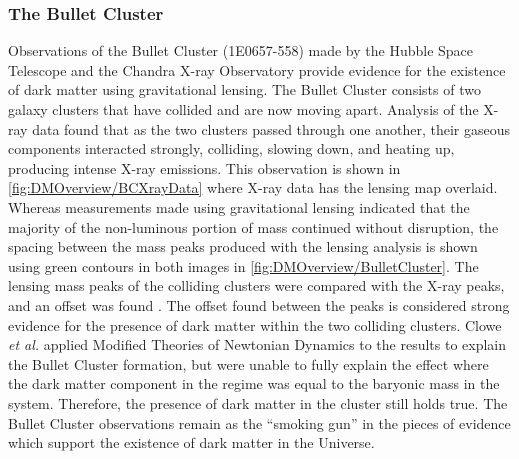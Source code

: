 \subsubsection{The Bullet Cluster}\label{sec:DMOverview/BulletCluster}
Observations of the Bullet Cluster (1E0657-558) made by the Hubble Space Telescope and the Chandra X-ray Observatory provide evidence for the existence of dark matter using gravitational lensing.
The Bullet Cluster consists of two galaxy clusters that have collided and are now moving apart. 
Analysis of the X-ray data found that as the two clusters passed through one another, their gaseous components interacted strongly, colliding, slowing down, and heating up, producing intense X-ray emissions. This observation is shown in \autoref{fig:DMOverview/BCXrayData} where X-ray data has the lensing map overlaid.  Whereas measurements made using gravitational lensing indicated that the majority of the non-luminous portion of mass continued without disruption, the spacing between the mass peaks produced with the lensing analysis is shown using green contours in both images in \autoref{fig:DMOverview/BulletCluster}. The lensing mass peaks of the colliding clusters were compared with the X-ray peaks, and an offset was found \cite{Clowe_2004}. The offset found between the peaks is considered strong evidence for the presence of dark matter within the two colliding clusters. Clowe \textit{et al.}\cite{Clowe2006} applied Modified Theories of Newtonian Dynamics to the results to explain the Bullet Cluster formation, but were unable to fully explain the effect where the dark matter component in the regime was equal to the baryonic mass in the system. Therefore, the presence of dark matter in the cluster still holds true. The Bullet Cluster observations remain as the ``smoking gun'' in the pieces of evidence which support the existence of dark matter in the Universe.
